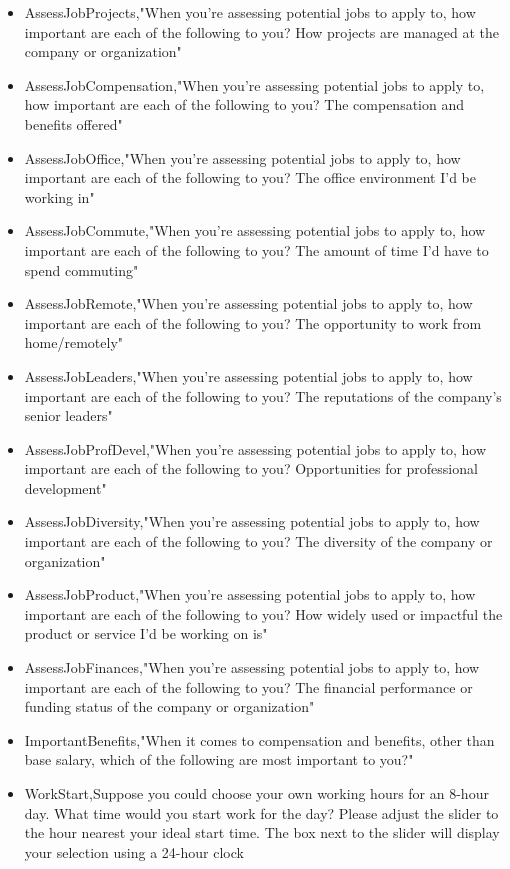 \begin{appendices}
\begin{itemize}
        \item AssessJobProjects,"When you're assessing potential jobs to apply to, how important are each of the following to you? How projects are managed at the company or organization"
        \item AssessJobCompensation,"When you're assessing potential jobs to apply to, how important are each of the following to you? The compensation and benefits offered"
        \item AssessJobOffice,"When you're assessing potential jobs to apply to, how important are each of the following to you? The office environment I'd be working in"
        \item AssessJobCommute,"When you're assessing potential jobs to apply to, how important are each of the following to you? The amount of time I'd have to spend commuting"
        \item AssessJobRemote,"When you're assessing potential jobs to apply to, how important are each of the following to you? The opportunity to work from home/remotely"
        \item AssessJobLeaders,"When you're assessing potential jobs to apply to, how important are each of the following to you? The reputations of the company's senior leaders"
        \item AssessJobProfDevel,"When you're assessing potential jobs to apply to, how important are each of the following to you? Opportunities for professional development"
        \item AssessJobDiversity,"When you're assessing potential jobs to apply to, how important are each of the following to you? The diversity of the company or organization"
        \item AssessJobProduct,"When you're assessing potential jobs to apply to, how important are each of the following to you? How widely used or impactful the product or service I'd be working on is"
        \item AssessJobFinances,"When you're assessing potential jobs to apply to, how important are each of the following to you? The financial performance or funding status of the company or organization"
        \item ImportantBenefits,"When it comes to compensation and benefits, other than base salary, which of the following are most important to you?"
        \item WorkStart,Suppose you could choose your own working hours for an 8-hour day. What time would you start work for the day? Please adjust the slider to the hour nearest your ideal start time. The box next to the slider will display your selection using a 24-hour clock

\end{itemize}
\end{appendices}
